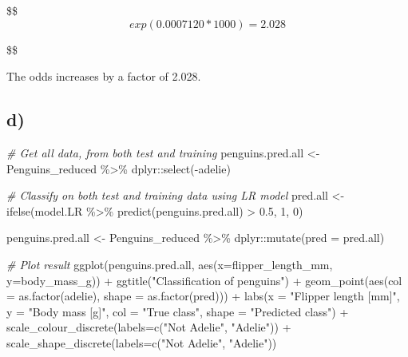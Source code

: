 \documentclass[
]{article}
\newenvironment{Shaded}{\begin{snugshade}}{\end{snugshade}}
\newcommand{\AttributeTok}[1]{\textcolor[rgb]{0.77,0.63,0.00}{#1}}
\newcommand{\CommentTok}[1]{\textcolor[rgb]{0.56,0.35,0.01}{\textit{#1}}}
\newcommand{\DecValTok}[1]{\textcolor[rgb]{0.00,0.00,0.81}{#1}}
\newcommand{\FloatTok}[1]{\textcolor[rgb]{0.00,0.00,0.81}{#1}}
\newcommand{\FunctionTok}[1]{\textcolor[rgb]{0.00,0.00,0.00}{#1}}
\newcommand{\NormalTok}[1]{#1}
\newcommand{\OtherTok}[1]{\textcolor[rgb]{0.56,0.35,0.01}{#1}}
\newcommand{\SpecialCharTok}[1]{\textcolor[rgb]{0.00,0.00,0.00}{#1}}
\newcommand{\StringTok}[1]{\textcolor[rgb]{0.31,0.60,0.02}{#1}}
\begin{document}
\$\$ \begin{equation}

exp(0.0007120 * 1000) = 2.028

\end{equation}

\$\$

The odds increases by a factor of 2.028.

\hypertarget{d-1}{%
\subsection{d)}\label{d-1}}

\begin{Shaded}
\begin{Highlighting}[]
\CommentTok{\# Get all data, from both test and training}
\NormalTok{penguins.pred.all }\OtherTok{\textless{}{-}}\NormalTok{ Penguins\_reduced }\SpecialCharTok{\%\textgreater{}\%}\NormalTok{ dplyr}\SpecialCharTok{::}\FunctionTok{select}\NormalTok{(}\SpecialCharTok{{-}}\NormalTok{adelie)}

\CommentTok{\# Classify on both test and training data using LR model}
\NormalTok{pred.all }\OtherTok{\textless{}{-}} \FunctionTok{ifelse}\NormalTok{(model.LR }\SpecialCharTok{\%\textgreater{}\%} \FunctionTok{predict}\NormalTok{(penguins.pred.all) }\SpecialCharTok{\textgreater{}} \FloatTok{0.5}\NormalTok{, }\DecValTok{1}\NormalTok{, }\DecValTok{0}\NormalTok{)}

\NormalTok{penguins.pred.all }\OtherTok{\textless{}{-}}\NormalTok{ Penguins\_reduced }\SpecialCharTok{\%\textgreater{}\%}\NormalTok{ dplyr}\SpecialCharTok{::}\FunctionTok{mutate}\NormalTok{(}\AttributeTok{pred =}\NormalTok{ pred.all)}

\CommentTok{\# Plot result}
\FunctionTok{ggplot}\NormalTok{(penguins.pred.all, }\FunctionTok{aes}\NormalTok{(}\AttributeTok{x=}\NormalTok{flipper\_length\_mm, }\AttributeTok{y=}\NormalTok{body\_mass\_g)) }\SpecialCharTok{+} 
  \FunctionTok{ggtitle}\NormalTok{(}\StringTok{"Classification of penguins"}\NormalTok{) }\SpecialCharTok{+}
  \FunctionTok{geom\_point}\NormalTok{(}\FunctionTok{aes}\NormalTok{(}\AttributeTok{col =} \FunctionTok{as.factor}\NormalTok{(adelie), }\AttributeTok{shape =} \FunctionTok{as.factor}\NormalTok{(pred))) }\SpecialCharTok{+} 
  \FunctionTok{labs}\NormalTok{(}\AttributeTok{x =} \StringTok{"Flipper length [mm]"}\NormalTok{,}
       \AttributeTok{y =} \StringTok{"Body mass [g]"}\NormalTok{,}
       \AttributeTok{col =} \StringTok{"True class"}\NormalTok{,}
       \AttributeTok{shape =} \StringTok{"Predicted class"}\NormalTok{) }\SpecialCharTok{+} 
  \FunctionTok{scale\_colour\_discrete}\NormalTok{(}\AttributeTok{labels=}\FunctionTok{c}\NormalTok{(}\StringTok{"Not Adelie"}\NormalTok{, }\StringTok{"Adelie"}\NormalTok{)) }\SpecialCharTok{+}
  \FunctionTok{scale\_shape\_discrete}\NormalTok{(}\AttributeTok{labels=}\FunctionTok{c}\NormalTok{(}\StringTok{"Not Adelie"}\NormalTok{, }\StringTok{"Adelie"}\NormalTok{))}
\end{Highlighting}
\end{Shaded}
\end{document}
